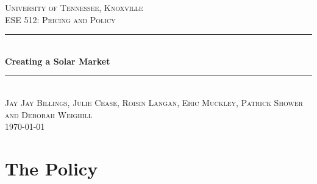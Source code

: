 \documentclass[10pt]{book} %
\begin{document}

\begin{titlepage}

\newcommand{\HRule}{\rule{\linewidth}{0.5mm}} %

\center %

\textsc{\LARGE University of Tennessee, Knoxville}\\[1.5cm] %
\textsc{\Large ESE 512: Pricing and Policy}\\[0.5cm] %

\HRule \\[0.4cm]
{ \huge \bfseries Creating a Solar Market}\\[0.4cm] %
\HRule \\[1.5cm]

\textsc{\large Jay Jay Billings, Julie Cease, Roisin Langan, Eric Muckley,
Patrick Shower and Deborah Weighill}\\[0.5cm] %





{\large \today}\\[3cm] %




\end{titlepage}





\chapter{The Policy}
\end{document}
